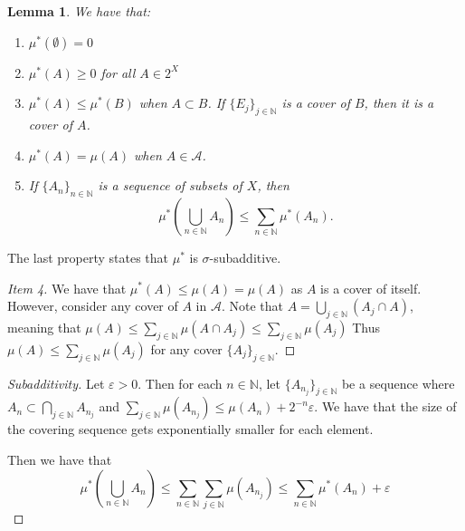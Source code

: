 \documentclass{article}
\newtheorem{lemma}[theorem]{Lemma}
\theoremstyle{definition}
\numberwithin{theorem}{section}
\numberwithin{equation}{section}
\newcommand{\alg}{\mathcal{A}}
\begin{document}
\begin{lemma}
	We have that:
	\begin{enumerate}
		\item $\mu^*(\emptyset) = 0$
		\item $\mu^*(A) \geq 0$ for all $A \in 2^X$
		\item $\mu^*(A) \leq \mu^*(B)$ when $A \subset B$. If $\lbrace E_j \rbrace_{j \in \mathbb{N}}$ is a cover of $B$, then it is a cover of $A$.
		\item $\mu^*(A) = \mu(A)$ when $A \in \alg$. 
		\item If $\lbrace A_n \rbrace_{n \in \mathbb{N}}$ is a sequence of subsets of $X$, then
		\begin{equation}
			\mu^*\left(\bigcup_{n \in \mathbb{N}} A_n \right) \leq \sum_{n \in \mathbb{N}} \mu^*(A_n).
		\end{equation}
	\end{enumerate}
\end{lemma}
The last property states that $\mu^*$ is $\sigma$-subadditive.

\begin{proof}[Item 4]
	We have that $\mu^*(A) \leq \mu(A)= \mu(A)$ as $A$ is a cover of itself. However, consider any cover of $A$ in $\alg$. Note that $A = \bigcup_{j \in \mathbb{N}}(A_j \cap A)$, meaning that $\mu(A) \leq \sum_{j \in \mathbb{N}} \mu(A \cap A_j) \leq \sum_{j \in \mathbb{N}} \mu(A_j)$
	Thus $\mu(A) \leq \sum_{j \in \mathbb{N}} \mu(A_j)$ for any cover $\lbrace A_j \rbrace_{j \in \mathbb{N}}$. 
\end{proof}

\begin{proof}[Subadditivity]
	Let $\varepsilon > 0$. Then for each $n \in \mathbb{N}$, let $\lbrace A_{n_j} \rbrace_{j \in \mathbb{N}}$ be a sequence where $A_n \subset \bigcap_{j \in \mathbb{N}}  A_{n_j}$ and $\sum_{j \in \mathbb{N}}\mu(A_{n_j}) \leq \mu(A_n) + 2^{-n} \varepsilon$. We have that the size of the covering sequence gets exponentially smaller for each element. 
	
	Then we have that 
	\begin{equation}
		\mu^* \left(\bigcup_{n \in \mathbb{N}}A_n \right) \leq \sum_{n \in \mathbb{N}} \sum_{j \in \mathbb{N}} \mu(A_{n_j}) \leq \sum_{n \in \mathbb{N}}\mu^*(A_n) + \varepsilon
	\end{equation}
\end{proof}
\end{document}
